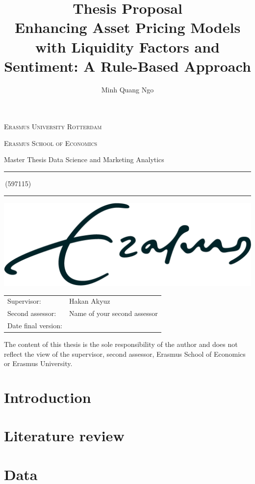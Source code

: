 \documentclass[a4paper,11pt]{article}
\author{Minh Quang Ngo}
\title{Thesis Proposal \\ Enhancing Asset Pricing Models with Liquidity Factors and Sentiment: A Rule-Based Approach}
\newcommand{\studentnumber}{597115}
\newcommand{\program}{Data Science and Marketing Analytics}
\newcommand{\supervisor}{Hakan Akyuz}
\newcommand{\secondassesor}{Name of your second assessor}
\begin{document}
\begin{titlepage}
\makeatletter
\begin{center}
	\textsc{Erasmus University Rotterdam}
	\par \textsc{Erasmus School of Economics}
	\par Master Thesis \program

	\vfill \hrule height .08em \bigskip
	\par\huge\@title\bigskip
	\par\Large\@author\,(\studentnumber)\bigskip
	\hrule height .08em\normalsize
	
	\vfill
	\includegraphics[width=\textwidth,height=0.15\textheight,keepaspectratio]{eur} %
	\vfill
	
	\begin{tabular}{ll}
		\toprule
		Supervisor: & \supervisor\\
		Second assessor: & \secondassesor\\
		Date final version: & \@date\\
		\bottomrule
	\end{tabular}
	
	\vfill
	The content of this thesis is the sole responsibility of the author and does not reflect the view of the supervisor, second assessor, Erasmus School of Economics or Erasmus University.
\end{center}
\makeatother
\end{titlepage}

\section{Introduction}
    
\section{Literature review}
	
\section{Data}
	
\end{document}
